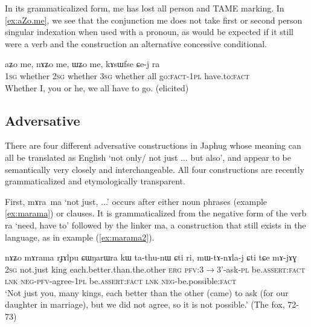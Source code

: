 \documentclass[oldfontcommands,oneside,a4paper,11pt]{article}
\newcommand{\ipa}[1]{\mbox{\phon #1}} %
\begin{document}
 In its grammaticalized form, \ipa{me} has lost all person and TAME marking.  In \ref{ex:aZo.me}, we see that the conjunction \ipa{me} does not take first or second person singular indexation when used with a pronoun, as would be expected if it still were a verb and the construction an alternative  concessive conditional.
 
 \begin{exe}
\ex \label{ex:aZo.me}
\gll 
 \ipa{aʑo} 	\ipa{me,} 	\ipa{nɤʑo} 	\ipa{me,} 	\ipa{ɯʑo} 	\ipa{me,} 	\ipa{kɤsɯfse} 	\ipa{ɕe-j} 	\ipa{ra} \\
\textsc{1sg} whether \textsc{2sg} whether \textsc{3sg} whether all go:\textsc{fact}-\textsc{1pl} have.to:\textsc{fact} \\
\glt Whether I, you or he, we all have to go. (elicited)
\end{exe}


\subsection{Adversative}
There are four different  adversative constructions in Japhug whose meaning can all be translated as English  `not only/ not just ... but also', and appear to be semantically very closely and interchangeable. All four constructions are recently grammaticalized and etymologically transparent.

First, \ipa{mɤra ma} `not just, ...'  occurs after either noun phrases (example  \ref{ex:marama}) or clauses. It is grammaticalized from the negative form of the verb \ipa{ra} `need, have to' followed by the linker \ipa{ma}, a construction that still exists in the language, as in example (\ref{ex:marama2}).

\begin{exe}
\ex \label{ex:marama}
\gll \ipa{nɤʑo} 	\ipa{mɤrama} 	\ipa{rɟɤlpu} 	\ipa{ɕɯŋarɯra} 	\ipa{kɯ} 	\ipa{ta-thu-nɯ} 	\ipa{ɕti} 	\ipa{ri,} 	\ipa{mɯ-tɤ-nɤla-j} 	\ipa{ɕti} 	\ipa{tɕe} 	\ipa{mɤ-jɤɣ}  \\
\textsc{2sg} not.just king each.better.than.the.other \textsc{erg} \textsc{pfv}:3$\rightarrow$3'-ask-\textsc{pl} be.\textsc{assert:fact} \textsc{lnk} \textsc{neg-pfv}-agree-\textsc{1pl} be.\textsc{assert:fact} \textsc{lnk} \textsc{neg}-be.possible:\textsc{fact} \\
\glt `Not just you, many kings, each better than the other (came) to ask (for our daughter in marriage), but we did not agree, so it is not possible.' (The fox, 72-73)
\end{exe}
\end{document}
